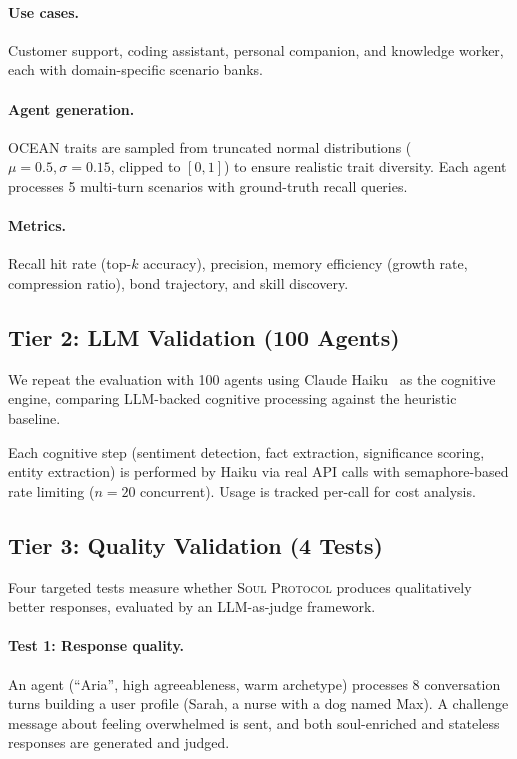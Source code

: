 \documentclass{article}
\newcommand{\soul}{\textsc{Soul Protocol}}
\begin{document}
\paragraph{Use cases.} Customer support, coding assistant, personal companion, and knowledge worker, each with domain-specific scenario banks.

\paragraph{Agent generation.} OCEAN traits are sampled from truncated normal distributions ($\mu = 0.5, \sigma = 0.15$, clipped to $[0, 1]$) to ensure realistic trait diversity. Each agent processes 5 multi-turn scenarios with ground-truth recall queries.

\paragraph{Metrics.} Recall hit rate (top-$k$ accuracy), precision, memory efficiency (growth rate, compression ratio), bond trajectory, and skill discovery.

\subsection{Tier 2: LLM Validation (100 Agents)}

We repeat the evaluation with 100 agents using Claude Haiku~\cite{anthropic2024haiku} as the cognitive engine, comparing LLM-backed cognitive processing against the heuristic baseline.

Each cognitive step (sentiment detection, fact extraction, significance scoring, entity extraction) is performed by Haiku via real API calls with semaphore-based rate limiting ($n = 20$ concurrent). Usage is tracked per-call for cost analysis.

\subsection{Tier 3: Quality Validation (4 Tests)}

Four targeted tests measure whether \soul{} produces qualitatively better responses, evaluated by an LLM-as-judge framework.

\paragraph{Test 1: Response quality.} An agent (``Aria'', high agreeableness, warm archetype) processes 8 conversation turns building a user profile (Sarah, a nurse with a dog named Max). A challenge message about feeling overwhelmed is sent, and both soul-enriched and stateless responses are generated and judged.
\end{document}

